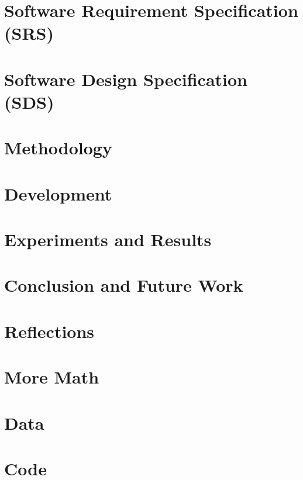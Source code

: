 \documentclass[12pt,twosided]{report}
\begin{document}
\chapter{Software Requirement Specification (SRS)}
\label{chap:srs}


\chapter{Software Design Specification (SDS)}
\label{chap:sds}


\chapter{Methodology}
\label{chap:method}


\chapter{Development}
\label{chap:dev}


\chapter{Experiments and Results}
\label{chap:results}


\chapter{Conclusion and Future Work}
\label{chap:outro}


\chapter{Reflections}
\label{chap:reflections}


\begin{appendices}

  
\chapter{More Math}


\chapter{Data}


\chapter{Code}

\end{appendices}

\printbibliography[heading=bibintoc,title={References}]
\end{document}
